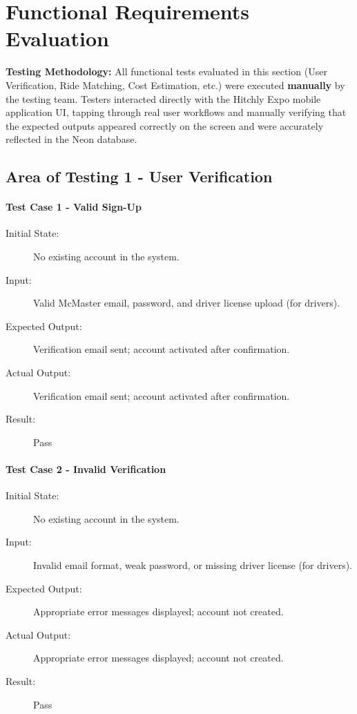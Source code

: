 \section{Functional Requirements Evaluation}
\textbf{Testing Methodology:} All functional tests evaluated in this section (User Verification, Ride Matching, Cost Estimation, etc.) 
were executed \textbf{manually} by the testing team. Testers interacted directly with the Hitchly Expo mobile application UI, tapping through 
real user workflows and manually verifying that the expected outputs appeared correctly on the screen and were accurately reflected in the Neon database.
\subsection{Area of Testing 1 - User Verification}
\paragraph{Test Case 1 - Valid Sign-Up} \label{test-FR1-1}
\begin{description}
    \item[Initial State:] No existing account in the system. 
    \item[Input:] Valid McMaster email, password, and driver license upload (for drivers).
    \item[Expected Output:] Verification email sent; account activated after confirmation.
    \item[Actual Output:] Verification email sent; account activated after confirmation.
    \item[Result:] Pass
\end{description}

\paragraph{Test Case 2 - Invalid Verification} \label{test-FR1-2}
\begin{description}
    \item[Initial State:] No existing account in the system. 
    \item[Input:] Invalid email format, weak password, or missing driver license (for drivers).
    \item[Expected Output:] Appropriate error messages displayed; account not created.
    \item[Actual Output:] Appropriate error messages displayed; account not created.
    \item[Result:] Pass
\end{description}


